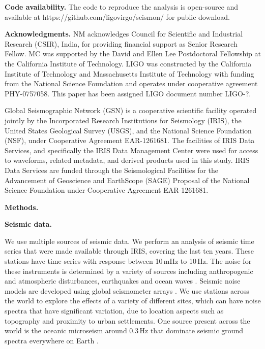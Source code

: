 \documentclass[preprint, aps, showpacs]{revtex4-1}
\begin{document}
\textbf{Code availability.}
The code to reproduce the analysis is open-source and available at https://github.com/ligovirgo/seismon/ for public download.

\textbf{Acknowledgments.}
NM acknowledges Council for Scientific and Industrial Research (CSIR), India, for providing financial support as Senior Research Fellow.  MC was supported by the David and Ellen Lee Postdoctoral Fellowship at the California Institute of Technology. LIGO was constructed by the California Institute of Technology and Massachusetts Institute of Technology with funding from the National Science Foundation and operates under cooperative agreement PHY-0757058.
This paper has been assigned LIGO document number LIGO-?.

Global Seismographic Network (GSN) is a cooperative scientific facility operated jointly by the Incorporated Research Institutions for Seismology (IRIS), the United States Geological Survey (USGS), and the National Science Foundation (NSF), under Cooperative Agreement EAR-1261681.
The facilities of IRIS Data Services, and specifically the IRIS Data Management Center were used for access to waveforms, related metadata, and derived products used in this study. IRIS Data Services are funded through the Seismological Facilities for the Advancement of Geoscience and EarthScope (SAGE) Proposal of the National Science Foundation under Cooperative Agreement EAR-1261681.




\textbf{Methods.}

\textbf{Seismic data.}

We use multiple sources of seismic data.
We perform an analysis of seismic time series that were made available through IRIS, covering the last ten years.
These stations have time-series with response between 10\,mHz to 10\,Hz.
The noise for these instruments is determined by a variety of sources including anthropogenic and atmospheric disturbances, earthquakes and ocean waves \cite{BCB2006}. 
Seismic noise models are developed using global seismometer arrays  \cite{Pet1993,BDE2004,McEA2009}.
We use stations across the world to explore the effects of a variety of different sites, which can have noise spectra that have significant variation, due to location aspects such as topography and proximity to urban settlements.
One source present across the world is the oceanic microseism around 0.3\,Hz that dominate seismic ground spectra everywhere on Earth \cite{HMS1963,ToLa1968,Ces1994,FKK1998}. 
\end{document}
